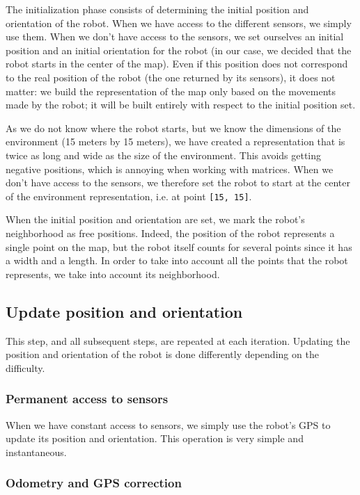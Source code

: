 \documentclass[a4paper, 10pt, conference]{ieeeconf}
\begin{document}
    The initialization phase consists of determining the initial position and orientation of the robot. When we have access to the different sensors, we simply use them. When we don't have access to the sensors, we set ourselves an initial position and an initial orientation for the robot (in our case, we decided that the robot starts in the center of the map). Even if this position does not correspond to the real position of the robot (the one returned by its sensors), it does not matter: we build the representation of the map only based on the movements made by the robot; it will be built entirely with respect to the initial position set.
    
    As we do not know where the robot starts, but we know the dimensions of the environment (15 meters by 15 meters), we have created a representation that is twice as long and wide as the size of the environment. This avoids getting negative positions, which is annoying when working with matrices. When we don't have access to the sensors, we therefore set the robot to start at the center of the environment representation, i.e. at point \texttt{[15, 15]}.
    
    When the initial position and orientation are set, we mark the robot's neighborhood as free positions. Indeed, the position of the robot represents a single point on the map, but the robot itself counts for several points since it has a width and a length. In order to take into account all the points that the robot represents, we take into account its neighborhood.
    
    \subsection{Update position and orientation}
    
    This step, and all subsequent steps, are repeated at each iteration. Updating the position and orientation of the robot is done differently depending on the difficulty.
    
    \subsubsection{Permanent access to sensors}
    
    When we have constant access to sensors, we simply use the robot's GPS to update its position and orientation. This operation is very simple and instantaneous.
    
    \subsubsection{Odometry and GPS correction}
    
\end{document}
